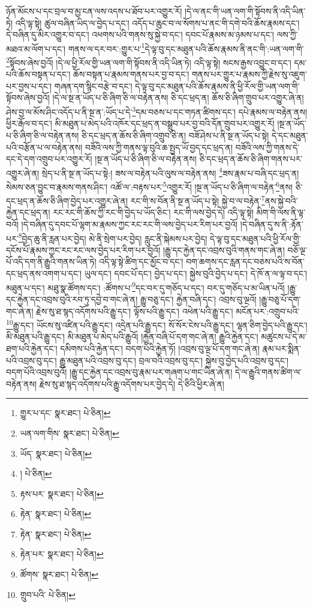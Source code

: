ཉོན་མོངས་པ་དང་བྲལ་བ་མྱ་ངན་ལས་འདས་པ་ཐོབ་པར་འགྱུར་རོ། །དེ་ལ་ནང་གི་ཡན་ལག་གི་སྟོབས་ནི་འདི་ཡིན་ཏེ། འདི་ལྟ་སྟེ། ཚུལ་བཞིན་ཡིད་ལ་བྱེད་པ་དང་། འདོད་པ་ཆུང་བ་ལ་སོགས་པ་ནང་གི་དགེ་བའི་ཆོས་རྣམས་དང་། དེ་བཞིན་དུ་མིར་འགྱུར་བ་དང་། འཕགས་པའི་གནས་སུ་སྐྱེ་བ་དང་། དབང་པོ་རྣམས་མ་ཉམས་པ་དང་། ལས་ཀྱི་མཐའ་མ་ལོག་པ་དང་། གནས་ལ་དར་བར་:གྱུར་པ་\footnote{གྱུར་པ་དང་  སྣར་ཐང་།  པེ་ཅིན། }དེ་ལྟ་བུ་དང་མཐུན་པའི་ཆོས་རྣམས་ནི་ནང་གི་:ཡན་ལག་གི་\footnote{ཡན་ལག་གིས་  སྣར་ཐང་།  པེ་ཅིན། }སྟོབས་ཞེས་བྱའོ། །དེ་ལ་ཕྱི་རོལ་གྱི་ཡན་ལག་གི་སྟོབས་ནི་འདི་ཡིན་ཏེ། འདི་ལྟ་སྟེ། སངས་རྒྱས་འབྱུང་བ་དང་། དམ་པའི་ཆོས་བསྟན་པ་དང་། ཆོས་བསྟན་པ་རྣམས་གནས་པར་བྱ་བ་དང་། གནས་པར་གྱུར་པ་རྣམས་ཀྱི་རྗེས་སུ་འཇུག་པར་བྱས་པ་དང་། གཞན་དག་སྙིང་བརྩེ་བ་དང་། དེ་ལྟ་བུ་དང་མཐུན་པའི་ཆོས་རྣམས་ནི་ཕྱི་རོལ་གྱི་ཡན་ལག་གི་སྟོབས་ཞེས་བྱའོ། །དེ་ལ་སྔ་ན་ཡོད་པ་ཅི་ཞིག་ཅི་ལ་བརྟེན་ནས། ཅི་དང་ཕྲད་ན། ཆོས་ཅི་ཞིག་གྲུབ་པར་འགྱུར་ཞེ་ན། ཤེས་བྱ་ལ་མོས་ཤིང་འདོད་པ་ནི་སྔ་ན་:ཡོད་པ་དེ་\footnote{ཡོད་  སྣར་ཐང་།  པེ་ཅིན། }དམ་བཅས་པ་དང་གཏན་ཚིགས་དང་། དཔེ་རྣམས་ལ་བརྟེན་ནས། ཕྱིར་རྒོལ་བ་དང་། མི་མཐུན་པ་མེད་པའི་འཁོར་དང་ཕྲད་ན་བསྒྲུབ་པར་བྱ་བའི་དོན་གྲུབ་པར་འགྱུར་རོ། །སྔ་ན་ཡོད་པ་ཅི་ཞིག་ཅི་ལ་བརྟེན་ནས། ཅི་དང་ཕྲད་ན་ཆོས་ཅི་ཞིག་འགྲུབ་ཅེ་ན། བཟོ་ཤེས་པ་ནི་སྔ་ན་ཡོད་པ་སྟེ། དེ་དང་མཐུན་པའི་བརྩོན་པ་ལ་བརྟེན་ནས། བཟོའི་ལས་ཀྱི་གནས་ལྟ་བུའི་ཆ་སྤྱད་ཡོ་བྱད་དང་ཕྲད་ན། བཟོའི་ལས་ཀྱི་གནས་དེ་དང་དེ་དག་འགྲུབ་པར་འགྱུར་རོ། །སྔ་ན་ཡོད་པ་ཅི་ཞིག་ཅི་ལ་བརྟེན་ནས། ཅི་དང་ཕྲད་ན་ཆོས་ཅི་ཞིག་གནས་པར་འགྱུར་ཞེ་ན། སྲེད་པ་ནི་སྔ་ན་ཡོད་པ་སྟེ:། ཟས་ལ་བརྟེན་པའི་ལུས་ལ་བརྟེན་ནས། \footnote{།    པེ་ཅིན། }ཟས་རྣམ་པ་བཞི་དང་ཕྲད་ན། སེམས་ཅན་བྱུང་བ་རྣམས་གནས་ཤིང་། འཚོ་ལ་:བརྟས་པར་\footnote{རྟས་པར་  སྣར་ཐང་།  པེ་ཅིན། }འགྱུར་རོ། །སྔ་ན་ཡོད་པ་ཅི་ཞིག་ལ་བརྟེན་\footnote{རྟེན་  སྣར་ཐང་།  པེ་ཅིན། }ནས། ཅི་དང་ཕྲད་ན་ཆོས་ཅི་ཞིག་བྱེད་པར་འགྱུར་ཞེ་ན། རང་གི་ས་བོན་ནི་སྔ་ན་ཡོད་པ་སྟེ། སྐྱེ་བ་ལ་བརྟེན་\footnote{རྟེན་  སྣར་ཐང་།  པེ་ཅིན། }ནས་སྐྱེ་བའི་རྐྱེན་དང་ཕྲད་ན། རང་རང་གི་ཆོས་ཀྱི་རང་གི་བྱེད་པ་ཡོད་ཅིང་། རང་གི་ལས་བྱེད་དེ། འདི་ལྟ་སྟེ། མིག་གི་ལས་ནི་ལྟ་བའོ། །དེ་བཞིན་དུ་དབང་པོ་ལྷག་མ་རྣམས་ཀྱང་རང་རང་གི་ལས་བྱེད་པར་རིག་པར་བྱའོ། །དེ་བཞིན་དུ་ས་ནི་:རྟོན་པར་\footnote{རྟེན་པར་  སྣར་ཐང་།  པེ་ཅིན། }བྱེད་ཆུ་ནི་རླན་པར་བྱེད། མེ་ནི་སྲེག་པར་བྱེད། རླུང་ནི་སྐེམས་པར་བྱེད། དེ་ལྟ་བུ་དང་མཐུན་པའི་ཕྱི་རོལ་གྱི་དངོས་པོ་རྣམས་ཀྱང་རང་རང་ལས་བྱེད་པར་རིག་པར་བྱའོ། །རྒྱུ་དང་རྐྱེན་དང་འབྲས་བུའི་གནས་གང་ཞེ་ན། བཅོ་ལྔ་པོ་འདི་དག་ནི་རྒྱུའི་གནས་ཡིན་ཏེ། འདི་ལྟ་སྟེ་ཚིག་དང་མྱོང་བ་དང་། བག་ཆགས་དང་རླན་དང་བཅས་པའི་ས་བོན་དང་ཕྲད་ནས་འགག་པ་དང་། ཡུལ་དང་། དབང་པོ་དང་། བྱེད་པ་དང་། སྐྱེས་བུའི་བྱེད་པ་དང་། དེ་ཁོ་ན་ལ་ལྟ་བ་དང་། མཐུན་པ་དང་། མཐུ་སྣ་ཚོགས་དང་། :ཚོགས་པ་\footnote{ཚོགས་  སྣར་ཐང་།  པེ་ཅིན། }དང་བར་དུ་གཅོད་པ་དང་། བར་དུ་གཅོད་པ་མ་ཡིན་པའོ། །རྒྱུ་དང་རྐྱེན་དང་འབྲས་བུའི་རབ་ཏུ་དབྱེ་བ་གང་ཞེ་ན། རྒྱུ་བཅུ་དང་། རྐྱེན་བཞི་དང་། འབྲས་བུ་ལྔའོ། །རྒྱུ་བཅུ་པོ་དག་གང་ཞེ་ན། རྗེས་སུ་ཐ་སྙད་འདོགས་པའི་རྒྱུ་དང་། ལྟོས་པའི་རྒྱུ་དང་། འཕེན་པའི་རྒྱུ་དང་། མངོན་པར་:འགྲུབ་པའི་\footnote{གྲུབ་པའི་  པེ་ཅིན། }རྒྱུ་དང་། ཡོངས་སུ་འཛིན་པའི་རྒྱུ་དང་། འདྲེན་པའི་རྒྱུ་དང་། སོ་སོར་ངེས་པའི་རྒྱུ་དང་། ལྷན་ཅིག་བྱེད་པའི་རྒྱུ་དང་། མི་མཐུན་པའི་རྒྱུ་དང་། མི་མཐུན་པ་མེད་པའི་རྒྱུའོ། །རྐྱེན་བཞི་པོ་དག་གང་ཞེ་ན། རྒྱུའི་རྐྱེན་དང་། མཚུངས་པ་དེ་མ་ཐག་པའི་རྐྱེན་དང་། དམིགས་པའི་རྐྱེན་དང་། བདག་པོའི་རྐྱེན་ཏོ། །འབྲས་བུ་ལྔ་པོ་དག་གང་ཞེ་ན། རྣམ་པར་སྨིན་པའི་འབྲས་བུ་དང་། རྒྱུ་མཐུན་པའི་འབྲས་བུ་དང་། བྲལ་བའི་འབྲས་བུ་དང་། སྐྱེས་བུ་བྱེད་པའི་འབྲས་བུ་དང་། བདག་པོའི་འབྲས་བུའོ། །རྒྱུ་དང་རྐྱེན་དང་འབྲས་བུ་རྣམ་པར་གཞག་པ་གང་ཡིན་ཞེ་ན། དེ་ལ་རྒྱུའི་གནས་ཚིག་ལ་བརྟེན་ནས། རྗེས་སུ་ཐ་སྙད་འདོགས་པའི་རྒྱུ་འདོགས་པར་བྱེད་དེ། དེ་ཅིའི་ཕྱིར་ཞེ་ན། 